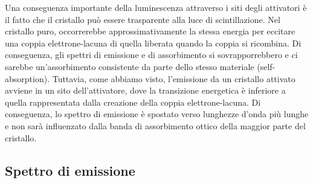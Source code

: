 Una conseguenza importante della luminescenza attraverso i siti degli attivatori è il fatto che il cristallo può essere trasparente alla luce di scintillazione. Nel cristallo puro, occorrerebbe approssimativamente la stessa energia per eccitare una coppia elettrone-lacuna di quella liberata quando la coppia si ricombina. Di conseguenza, gli spettri di emissione e di assorbimento si sovrapporrebbero e ci sarebbe un'assorbimento consistente da parte dello stesso materiale (self-absorption). Tuttavia, come abbiamo visto, l'emissione da un cristallo attivato avviene in un sito dell'attivatore, dove la transizione energetica è inferiore a quella rappresentata dalla creazione della coppia elettrone-lacuna. Di conseguenza, lo spettro di emissione è spostato verso lunghezze d'onda più lunghe e non sarà influenzato dalla banda di assorbimento ottico della maggior parte del cristallo.

\subsection{Spettro di emissione}

